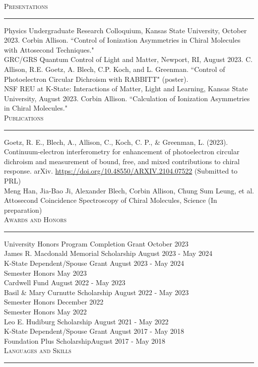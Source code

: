 \documentclass{article}
\newcommand{\return}{\\[6pt]}
\newcommand{\sect}[1]{
\noindent\large{\textsc{#1}}\\[-6pt]\normalsize{\noindent\rule{\textwidth}{0.5pt}}
}
\begin{document}
\iffalse
\sect{Additional Work Experience}
\textbf{Heartland Electric, Inc.}, Fort Riley, KS\hfill May 2015 - August 2022\\
Electrician\begin{itemize}
	\item Industrial, commercial, and residential electrical installation, troubleshooting, and repair
	\item Independent work on control systems, including SCADA, variable frequency drives, and motor control systems
\end{itemize}
\fi\newpage
\sect{Presentations}
Physics Undergraduate Research Colloquium, Kansas State University, October 2023. Corbin Allison. ``Control of Ionization Asymmetries in Chiral Molecules with Attosecond Techniques." \return
GRC/GRS Quantum Control of Light and Matter, Newport, RI, August 2023. C. Allison, R.E. Goetz, A. Blech, C.P. Koch, and L. Greenman. ``Control of Photoelectron Circular Dichroism with RABBITT" (poster). \return
NSF REU at K-State: Interactions of Matter, Light and Learning, Kansas State University, August 2023. Corbin Allison. ``Calculation of Ionization Asymmetries in Chiral Molecules."\return
\sect{Publications}
Goetz, R. E., Blech, A., Allison, C., Koch, C. P., \& Greenman, L. (2023). Continuum-electron interferometry for enhancement of photoelectron circular dichroism and measurement of bound, free, and mixed contributions to chiral response. arXiv.  \url{https://doi.org/10.48550/ARXIV.2104.07522} (Submitted to PRL)\return
Meng Han, Jia-Bao Ji, Alexander Blech, Corbin Allison, Chung Sum Leung, et al. Attosecond Coincidence Spectroscopy of Chiral Molecules, Science (In preparation) \return
\sect{Awards and Honors}
University Honors Program Completion Grant \hfill October 2023 \return
James R. Macdonald Memorial Scholarship \hfill August 2023 - May 2024 \return
K-State Dependent/Spouse Grant \hfill August 2023 - May 2024 \return
Semester Honors \hfill May 2023 \return
Cardwell Fund \hfill August 2022 - May 2023 \return
Basil \& Mary Curnutte Scholarship \hfill August 2022 - May 2023 \return
Semester Honors \hfill December 2022 \return
Semester Honors \hfill May 2022 \return
Leo E. Hudiburg Scholarship \hfill August 2021 - May 2022 \return
K-State Dependent/Spouse Grant \hfill August 2017 - May 2018 \return
Foundation Plus Scholarship\hfill August 2017 - May 2018 \return
\sect{Languages and Skills}
\end{document}
